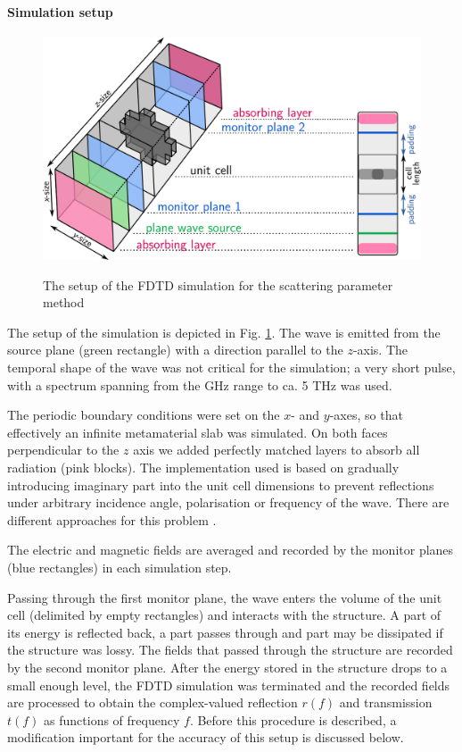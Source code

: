 \paragraph{Simulation setup} %
\begin{figure}[ht] \centering \caption{The setup of the FDTD simulation for the scattering parameter method} \includegraphics[width=12cm]{img/meep_geometry.pdf}  \label{fg_fdtd_sparam} \end{figure} %
The setup of the simulation is depicted in Fig. \ref{fg_fdtd_sparam}. The wave is emitted from the source plane (green rectangle) with a direction parallel to the $z$-axis. The temporal shape of the wave was not critical for the simulation; a very short pulse, with a spectrum spanning from the GHz range to ca. 5 THz was used. 

The periodic boundary conditions were set on the $x$- and $y$-axes, so that effectively an infinite metamaterial slab was simulated. On both faces perpendicular to the $z$ axis we added perfectly matched layers to absorb all radiation (pink blocks). The implementation used is based on gradually introducing imaginary part into the unit cell dimensions  to prevent reflections under arbitrary incidence angle, polarisation or frequency of the wave. There are different approaches for this problem \cite{oskooi2011distinguishing}. %

The electric and magnetic fields are averaged and recorded by the monitor planes (blue rectangles) in each simulation step.  

Passing through the first monitor plane, the wave enters the volume of the unit cell (delimited by empty rectangles) and interacts with the structure. A part of its energy is reflected back, a part passes through and part may be dissipated if the structure was lossy. The fields that passed through the structure are recorded by the second monitor plane. After the energy stored in the structure drops to a small enough level, the FDTD simulation was terminated and the recorded fields are processed to obtain the complex-valued reflection $r(f)$ and transmission $t(f)$ as functions of frequency $f$. Before this procedure is described, a modification important for the accuracy of this setup is discussed below.

